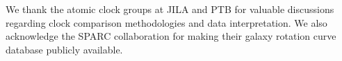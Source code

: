 \documentclass[aps,prd,twocolumn,superscriptaddress,showpacs,floatfix,nofootinbib]{revtex4-2}
\theoremstyle{plain}
\theoremstyle{definition}
\theoremstyle{remark}
\begin{document}
\newpage


\newpage


\newpage


\newpage


\newpage


\newpage


\newpage





\begin{acknowledgments}
We thank the atomic clock groups at JILA and PTB for valuable discussions regarding clock comparison methodologies and data interpretation. We also acknowledge the SPARC collaboration for making their galaxy rotation curve database publicly available.
\end{acknowledgments}


\end{document}
